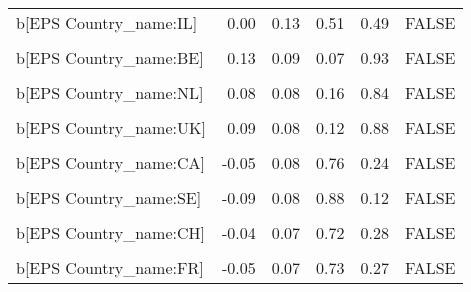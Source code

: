 \begin{table}
\begin{tabular}[t]{lrrrrl}
b[EPS Country\_name:IL] & 0.00 & 0.13 & 0.51 & 0.49 & FALSE\\
\cellcolor{gray!10}{b[(Intercept) Country\_name:BE]} & \cellcolor{gray!10}{0.13} & \cellcolor{gray!10}{0.24} & \cellcolor{gray!10}{0.29} & \cellcolor{gray!10}{0.71} & \cellcolor{gray!10}{FALSE}\\
b[EPS Country\_name:BE] & 0.13 & 0.09 & 0.07 & 0.93 & FALSE\\
\cellcolor{gray!10}{b[(Intercept) Country\_name:NL]} & \cellcolor{gray!10}{0.08} & \cellcolor{gray!10}{0.23} & \cellcolor{gray!10}{0.36} & \cellcolor{gray!10}{0.64} & \cellcolor{gray!10}{FALSE}\\
b[EPS Country\_name:NL] & 0.08 & 0.08 & 0.16 & 0.84 & FALSE\\
\cellcolor{gray!10}{b[(Intercept) Country\_name:UK]} & \cellcolor{gray!10}{0.08} & \cellcolor{gray!10}{0.22} & \cellcolor{gray!10}{0.35} & \cellcolor{gray!10}{0.65} & \cellcolor{gray!10}{FALSE}\\
b[EPS Country\_name:UK] & 0.09 & 0.08 & 0.12 & 0.88 & FALSE\\
\cellcolor{gray!10}{b[(Intercept) Country\_name:CA]} & \cellcolor{gray!10}{-0.05} & \cellcolor{gray!10}{0.20} & \cellcolor{gray!10}{0.61} & \cellcolor{gray!10}{0.39} & \cellcolor{gray!10}{FALSE}\\
b[EPS Country\_name:CA] & -0.05 & 0.08 & 0.76 & 0.24 & FALSE\\
\cellcolor{gray!10}{b[(Intercept) Country\_name:SE]} & \cellcolor{gray!10}{-0.08} & \cellcolor{gray!10}{0.23} & \cellcolor{gray!10}{0.63} & \cellcolor{gray!10}{0.37} & \cellcolor{gray!10}{FALSE}\\
b[EPS Country\_name:SE] & -0.09 & 0.08 & 0.88 & 0.12 & FALSE\\
\cellcolor{gray!10}{b[(Intercept) Country\_name:CH]} & \cellcolor{gray!10}{-0.03} & \cellcolor{gray!10}{0.21} & \cellcolor{gray!10}{0.55} & \cellcolor{gray!10}{0.45} & \cellcolor{gray!10}{FALSE}\\
b[EPS Country\_name:CH] & -0.04 & 0.07 & 0.72 & 0.28 & FALSE\\
\cellcolor{gray!10}{b[(Intercept) Country\_name:FR]} & \cellcolor{gray!10}{-0.03} & \cellcolor{gray!10}{0.22} & \cellcolor{gray!10}{0.56} & \cellcolor{gray!10}{0.44} & \cellcolor{gray!10}{FALSE}\\
b[EPS Country\_name:FR] & -0.05 & 0.07 & 0.73 & 0.27 & FALSE\\
\bottomrule
\end{tabular}
\end{table}
